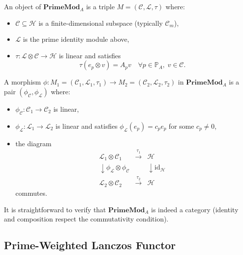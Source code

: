\documentclass[11pt]{article}
\begin{document}
\begin{definition}
An object of $\mathbf{PrimeMod}_A$ is a triple
$M = (\mathcal{C},\mathcal{L},\tau)$ where:
\begin{itemize}
  \item $\mathcal{C}\subseteq\mathcal{H}$ is a finite-dimensional
    subspace (typically $\mathcal{C}_m$),
  \item $\mathcal{L}$ is the prime identity module above,
  \item $\tau : \mathcal{L}\otimes\mathcal{C} \to \mathcal{H}$ is
    linear and satisfies
  \[
  \tau(e_p\otimes v) = A_p v \quad \forall p\in\mathbb{P}_A,\; v\in\mathcal{C}.
  \]
\end{itemize}
\end{definition}

\begin{definition}[Morphisms]
A morphism $\phi : M_1=(\mathcal{C}_1,\mathcal{L}_1,\tau_1)
\to M_2=(\mathcal{C}_2,\mathcal{L}_2,\tau_2)$ in
$\mathbf{PrimeMod}_A$ is a pair
$(\phi_{\mathcal{C}},\phi_{\mathcal{L}})$ where:
\begin{itemize}
  \item $\phi_{\mathcal{C}} : \mathcal{C}_1 \to \mathcal{C}_2$ is linear,
  \item $\phi_{\mathcal{L}} : \mathcal{L}_1 \to \mathcal{L}_2$ is linear
    and satisfies $\phi_{\mathcal{L}}(e_p) = c_p e_p$ for some
    $c_p\neq 0$,
  \item the diagram
  \[
  \begin{array}{ccc}
  \mathcal{L}_1\otimes\mathcal{C}_1 & \xrightarrow{\tau_1} & \mathcal{H} \\
  \downarrow \scriptstyle{\phi_{\mathcal{L}}\otimes\phi_{\mathcal{C}}} & &
  \downarrow \scriptstyle{\mathrm{id}_{\mathcal{H}}} \\
  \mathcal{L}_2\otimes\mathcal{C}_2 & \xrightarrow{\tau_2} & \mathcal{H}
  \end{array}
  \]
  commutes.
\end{itemize}
\end{definition}

It is straightforward to verify that $\mathbf{PrimeMod}_A$ is indeed a
category (identity and composition respect the commutativity
condition).\cite{CategoryModules}

\subsection{Prime-Weighted Lanczos Functor}
\end{document}
